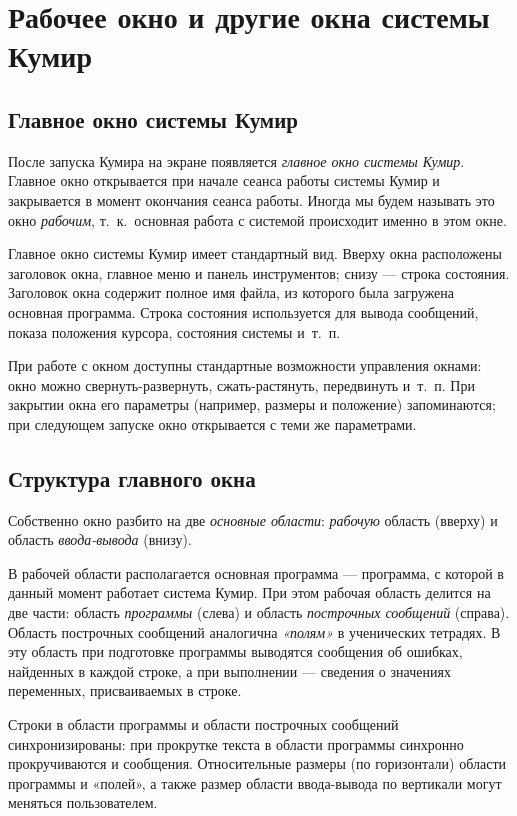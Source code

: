 \section{Рабочее окно и другие окна системы Кумир}
\label{windows}

\subsection{Главное окно системы Кумир}

После запуска Кумира на экране появляется \emph{главное окно системы Кумир}. Главное окно открывается при начале сеанса работы системы Кумир и закрывается в момент окончания сеанса работы. Иногда мы будем называть это окно \emph{рабочим}, т.~к.~основная работа с системой происходит именно в этом окне.

Главное окно системы Кумир имеет стандартный вид. Вверху окна расположены заголовок окна, главное меню и  панель инструментов; снизу --- строка состояния. Заголовок окна содержит полное имя файла, из которого была загружена основная программа. Строка состояния используется для вывода сообщений, показа положения курсора, состояния системы и~т.~п.

При работе с окном доступны стандартные возможности управления окнами: окно можно свернуть-развернуть, сжать-растянуть, передвинуть и~т.~п. При закрытии окна его параметры (например, размеры и положение) запоминаются; при следующем запуске окно открывается с теми же параметрами.

\subsection{Структура главного окна}

Собственно окно разбито на две \emph{основные области}: \emph{рабочую} область (вверху) и область \emph{ввода-вывода} (внизу).

В рабочей области располагается основная программа --- программа, с которой в данный момент работает система Кумир. При этом рабочая область делится на две части: область \emph{программы} (слева) и область \emph{построчных сообщений}  (справа). Область построчных сообщений  аналогична \emph{«полям»} в ученических тетрадях. В эту область при подготовке программы выводятся сообщения об ошибках,  найденных в каждой строке, а при выполнении --- сведения о значениях переменных, присваиваемых в  строке.

Строки в области программы  и области построчных сообщений синхронизированы: при прокрутке текста в области программы синхронно прокручиваются и сообщения. Относительные размеры (по горизонтали) области программы и «полей», а также размер области ввода-вывода по вертикали могут меняться пользователем. 

